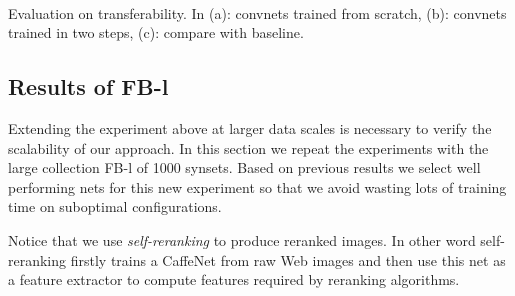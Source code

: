 \documentclass[preprint,12pt]{elsarticle}
\begin{document}
\begin{table}[!t]
{\begin{centering}
\par\end{centering}
\label{table:acc_IN-s_finetune_3rd}}\\
\caption{Evaluation on transferability. In (a): convnets trained from scratch, (b): convnets trained in two steps, (c): compare with baseline.}
\label{table:transfer_100}
\end{table}
\subsection{Results of FB-l}\label{sec:fb1k}
\noindent Extending the experiment above at larger data scales is necessary to verify the scalability of our approach. In this section we repeat the experiments with the large collection FB-l of 1000 synsets. Based on previous results we select well performing nets for this new experiment so that we avoid wasting lots of training time on suboptimal configurations. 

Notice that we use \emph{self-reranking} to produce reranked images. In other word  self-reranking firstly trains a CaffeNet from raw Web images and then use this net as a feature extractor to compute features required by reranking algorithms. 
\end{document}
